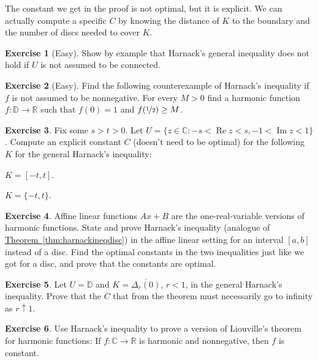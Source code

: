 \documentclass[12pt,openany]{book}
\renewcommand{\Re}{\operatorname{Re}}
\renewcommand{\Im}{\operatorname{Im}}
\newcommand{\C}{{\mathbb{C}}}
\newcommand{\R}{{\mathbb{R}}}
\newcommand{\D}{{\mathbb{D}}}
\theoremstyle{plain}
\theoremstyle{remark}
\theoremstyle{definition}
\newenvironment{exbox}{%
    \def\FrameCommand{\vrule width 1pt \relax\hspace{10pt}}%
    \MakeFramed{\advance\hsize-\width\FrameRestore}%
}{%
    \endMakeFramed
}
\newenvironment{expartshor}[1]{%
    \begingroup%
    \NumTabs{#1}%
    \leavevmode%
    \par%
    \begin{enumerate*}[a),itemjoin={\tab}]
}{%
    \end{enumerate*}\endgroup\par
}
\theoremstyle{exercise}
\newtheorem{exercise}{Exercise}[section]
\theoremstyle{example}
\newcommand{\thmref}[1]{\hyperref[#1]{Theorem~\ref*{#1}}}
\begin{document}
The constant we get in the proof is not optimal, but it is explicit.
We can actually compute a specific $C$ by knowing the distance of $K$
to the boundary and the number of discs needed to cover $K$.

\begin{exbox}
\begin{exercise}[Easy]
Show by example that Harnack's general inequality does not hold if $U$
is not assumed to be connected.
\end{exercise}

\begin{exercise}[Easy]
Find the following counterexample of Harnack's inequality
if $f$ is not assumed to be
nonnegative.  For every $M > 0$ find
a harmonic function $f \colon \D \to \R$ such that $f(0) = 1$ and
$f(\nicefrac{1}{2}) \geq M$.
\end{exercise}

\begin{exercise}
Fix some $s > t > 0$.
Let $U = \{z \in \C : -s < \Re z < s, -1 < \Im z < 1 \}$.
Compute an explicit constant $C$
(doesn't need to be optimal)
for the following $K$ for the general
Harnack's inequality:
\smallskip
\begin{expartshor}{2}
\item
$K = [-t,t]$.
\item
$K = \{-t,t\}$.
\end{expartshor}
\end{exercise}

\begin{exercise}
Affine linear functions $Ax+B$ are the one-real-variable
versions of harmonic functions.  State and prove Harnack's inequality
(analogue of \thmref{thm:harnackineqdisc})
in the affine linear setting for an interval $[a,b]$ instead of a disc.
Find the optimal constants in the two inequalities just like we got for a disc,
and prove that the constants are optimal.
\end{exercise}

\begin{exercise}
Let $U = \D$ and $K=\overline{\Delta_r(0)}$, $r < 1$, in the general 
Harnack's inequality.  Prove that the $C$ that from the theorem
must necessarily go to infinity as $r \uparrow 1$.
\end{exercise}

\begin{exercise}
Use Harnack's inequality to prove a version of Liouville's theorem
for harmonic functions:
If $f \colon \C \to \R$ is harmonic
and nonnegative, then $f$ is constant.
\end{exercise}
\end{exbox}
\end{document}
